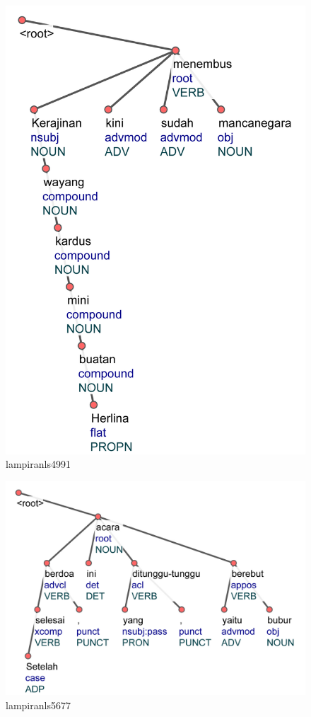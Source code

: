 \begin{figure}
	\centering \includegraphics[width=0.8
	\textwidth] {pics/lampiran/lampiranls4991.jpg} 
	\caption{lampiranls4991} 
	\label{fig:lampiranls4991} 
\end{figure}

\begin{figure}
	\centering \includegraphics[width=0.8
	\textwidth] {pics/lampiran/lampiranls5677.jpg} 
	\caption{lampiranls5677} 
	\label{fig:lampiranls5677} 
\end{figure}


